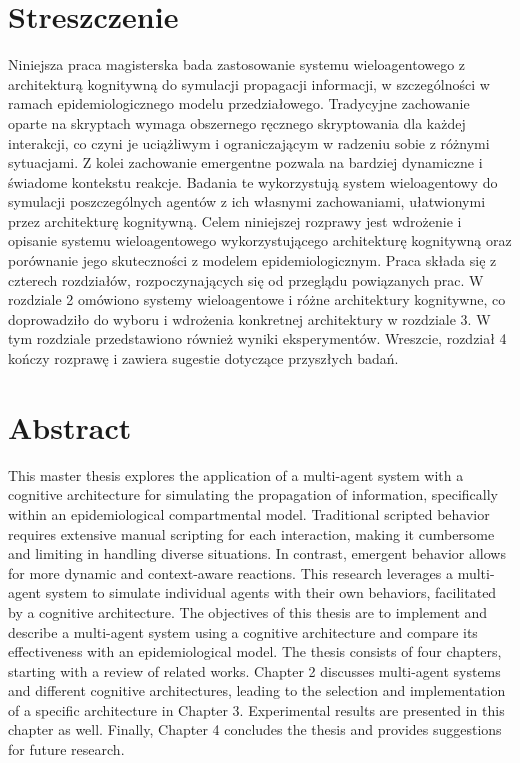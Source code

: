 \section*{Streszczenie}

Niniejsza praca magisterska bada zastosowanie systemu wieloagentowego z architekturą kognitywną do symulacji propagacji informacji, w szczególności w ramach epidemiologicznego modelu przedziałowego. Tradycyjne zachowanie oparte na skryptach wymaga obszernego ręcznego skryptowania dla każdej interakcji, co czyni je uciążliwym i ograniczającym w radzeniu sobie z różnymi sytuacjami. Z kolei zachowanie emergentne pozwala na bardziej dynamiczne i świadome kontekstu reakcje. Badania te wykorzystują system wieloagentowy do symulacji poszczególnych agentów z ich własnymi zachowaniami, ułatwionymi przez architekturę kognitywną. Celem niniejszej rozprawy jest wdrożenie i opisanie systemu wieloagentowego wykorzystującego architekturę kognitywną oraz porównanie jego skuteczności z modelem epidemiologicznym. Praca składa się z czterech rozdziałów, rozpoczynających się od przeglądu powiązanych prac. W rozdziale 2 omówiono systemy wieloagentowe i różne architektury kognitywne, co doprowadziło do wyboru i wdrożenia konkretnej architektury w rozdziale 3. W tym rozdziale przedstawiono również wyniki eksperymentów. Wreszcie, rozdział 4 kończy rozprawę i zawiera sugestie dotyczące przyszłych badań.

\section*{Abstract}

This master thesis explores the application of a multi-agent system with a cognitive architecture for simulating the propagation of information, specifically within an epidemiological compartmental model. Traditional scripted behavior requires extensive manual scripting for each interaction, making it cumbersome and limiting in handling diverse situations. In contrast, emergent behavior allows for more dynamic and context-aware reactions. This research leverages a multi-agent system to simulate individual agents with their own behaviors, facilitated by a cognitive architecture. The objectives of this thesis are to implement and describe a multi-agent system using a cognitive architecture and compare its effectiveness with an epidemiological model. The thesis consists of four chapters, starting with a review of related works. Chapter 2 discusses multi-agent systems and different cognitive architectures, leading to the selection and implementation of a specific architecture in Chapter 3. Experimental results are presented in this chapter as well. Finally, Chapter 4 concludes the thesis and provides suggestions for future research.